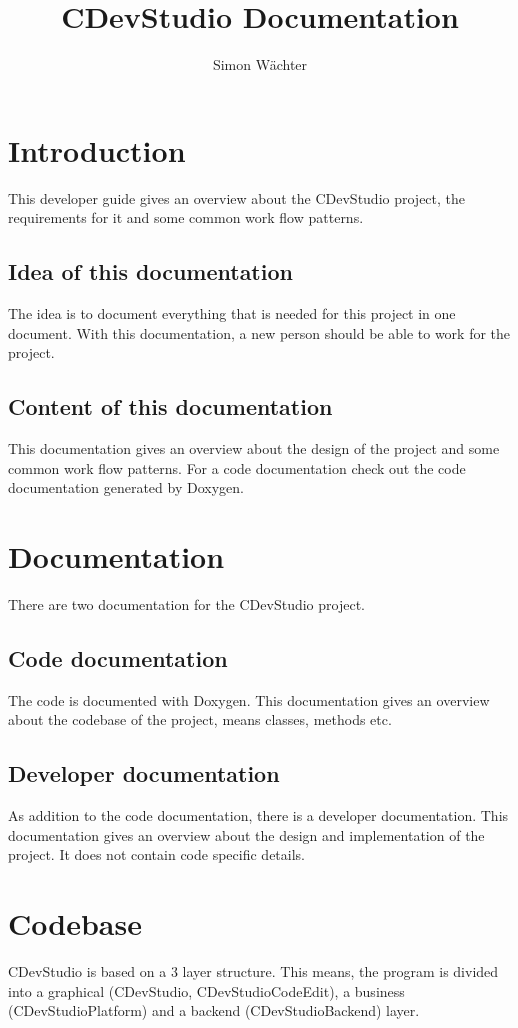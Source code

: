 \documentclass{article}
\title{CDevStudio Documentation}
\author{Simon Wächter}
\begin{document}
\maketitle
\newpage

\tableofcontents
\newpage

\section{Introduction}
This developer guide gives an overview about the CDevStudio project, the requirements for it and some common work flow patterns.

\subsection{Idea of this documentation}
The idea is to document everything that is needed for this project in one document. With this documentation, a new person should be able to work for the project.

\subsection{Content of this documentation}
This documentation gives an overview about the design of the project and some common work flow patterns. For a code documentation check out the code documentation generated by Doxygen.

\section{Documentation}
There are two documentation for the CDevStudio project.

\subsection{Code documentation}
The code is documented with Doxygen. This documentation gives an overview about the codebase of the project, means classes, methods etc.

\subsection{Developer documentation}
As addition to the code documentation, there is a developer documentation. This documentation gives an overview about the design and implementation of the project. It does not contain code specific details.

\section{Codebase}
CDevStudio is based on a 3 layer structure. This means, the program is divided into a graphical (CDevStudio, CDevStudioCodeEdit), a business (CDevStudioPlatform) and a backend (CDevStudioBackend) layer.
\end{document}
